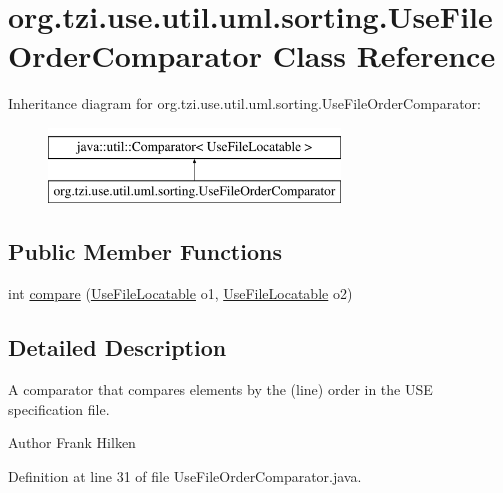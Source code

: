 \hypertarget{classorg_1_1tzi_1_1use_1_1util_1_1uml_1_1sorting_1_1_use_file_order_comparator}{\section{org.\-tzi.\-use.\-util.\-uml.\-sorting.\-Use\-File\-Order\-Comparator Class Reference}
\label{classorg_1_1tzi_1_1use_1_1util_1_1uml_1_1sorting_1_1_use_file_order_comparator}
}
Inheritance diagram for org.\-tzi.\-use.\-util.\-uml.\-sorting.\-Use\-File\-Order\-Comparator\-:\begin{figure}[H]
\begin{center}
\leavevmode
\includegraphics[height=2.000000cm]{classorg_1_1tzi_1_1use_1_1util_1_1uml_1_1sorting_1_1_use_file_order_comparator}
\end{center}
\end{figure}
\subsection*{Public Member Functions}
\begin{DoxyCompactItemize}
\item 
int \hyperlink{classorg_1_1tzi_1_1use_1_1util_1_1uml_1_1sorting_1_1_use_file_order_comparator_aac2a767eed427c6ee0c145de5edbb361}{compare} (\hyperlink{interfaceorg_1_1tzi_1_1use_1_1uml_1_1mm_1_1_use_file_locatable}{Use\-File\-Locatable} o1, \hyperlink{interfaceorg_1_1tzi_1_1use_1_1uml_1_1mm_1_1_use_file_locatable}{Use\-File\-Locatable} o2)
\end{DoxyCompactItemize}


\subsection{Detailed Description}
A comparator that compares elements by the (line) order in the U\-S\-E specification file.

\begin{DoxyAuthor}{Author}
Frank Hilken 
\end{DoxyAuthor}


Definition at line 31 of file Use\-File\-Order\-Comparator.\-java.



